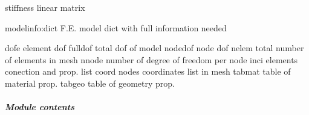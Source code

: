\documentclass[letterpaper,10pt,english]{sphinxmanual}
\begin{document}
\begin{fulllineitems}
\begin{fulllineitems}
\begin{description}
\end{description}

\end{fulllineitems}


\begin{fulllineitems}
\label{\detokenize{myfempy.felib.struct:myfempy.felib.struct.truss21.Truss21.stiff_linear}}
\pysigstartsignatures
{}
\pysigstopsignatures
\sphinxAtStartPar
stiffness linear matrix

\end{fulllineitems}


\begin{fulllineitems}
\label{\detokenize{myfempy.felib.struct:myfempy.felib.struct.truss21.Truss21.tabgeo}}
\pysigstartsignatures
{}
\pysigstopsignatures\begin{description}
\sphinxAtStartPar
modelinfo:dict     \textendash{} F.E. model dict with full information needed

\sphinxAtStartPar
dofe              \textendash{} element dof
fulldof           \textendash{} total dof of model
nodedof           \textendash{} node dof 
nelem             \textendash{} total number of elements in mesh
nnode             \textendash{} number of degree of freedom per node
inci              \textendash{} elements conection and prop. list
coord             \textendash{} nodes coordinates list in mesh
tabmat            \textendash{} table of material prop.
tabgeo            \textendash{} table of geometry prop.

\end{description}

\end{fulllineitems}


\end{fulllineitems}



\subparagraph{Module contents}
\label{\detokenize{myfempy.felib.struct:module-myfempy.felib.struct}}\label{\detokenize{myfempy.felib.struct:module-contents}}
\end{document}
